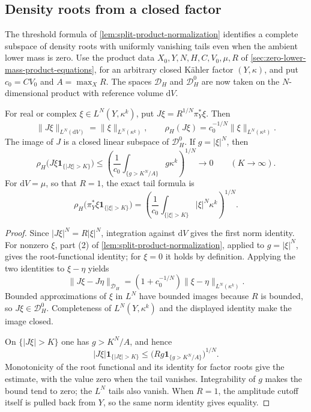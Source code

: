 \subsection{Density roots from a closed factor}
\label{subsec:closed-factor-roots}

The threshold formula of \cref{lem:split-product-normalization} identifies a complete subspace of density roots with uniformly vanishing tails even when the ambient lower mass is zero. Use the product data $X_0,Y,N,H,C,V_0,\mu,R$ of \cref{sec:zero-lower-mass-product-equations}, for an arbitrary closed K\"ahler factor $(Y,\kappa)$, and put $c_0=CV_0$ and $A=\max_XR$. The spaces $\mathcal D_H$ and $\mathcal D_H^0$ are now taken on the $N$-dimensional product with reference volume $\mathrm dV$.

\begin{proposition}\label{prop:closed-factor-density-roots}
For real or complex $\xi\in L^N(Y,\kappa^k)$, put $J\xi=R^{1/N}\pi_Y^*\xi$. Then
\[
 \|J\xi\|_{L^N(\mathrm dV)}=\|\xi\|_{L^N(\kappa^k)},\qquad
 \rho_H(J\xi)=c_0^{-1/N}\|\xi\|_{L^N(\kappa^k)}.
\]
The image of $J$ is a closed linear subspace of $\mathcal D_H^0$. If $g=|\xi|^N$, then
\[
 \rho_H\bigl(J\xi\mathbf1_{\{|J\xi|>K\}}\bigr)
 \leq\left(\frac1{c_0}\int_{\{g>K^N/A\}}g\kappa^k\right)^{1/N}
       \longrightarrow0
 \qquad(K\to\infty).
\]
For $\mathrm dV=\mu$, so that $R=1$, the exact tail formula is
\[
 \rho_H\bigl(\pi_Y^*\xi\mathbf1_{\{|\xi|>K\}}\bigr)
   =\left(\frac1{c_0}\int_{\{|\xi|>K\}}|\xi|^N\kappa^k\right)^{1/N}.
\]
\end{proposition}
\begin{proof}
Since $|J\xi|^N=R|\xi|^N$, integration against $\mathrm dV$ gives the first norm identity. For nonzero $\xi$, part (2) of \cref{lem:split-product-normalization}, applied to $g=|\xi|^N$, gives the root-functional identity; for $\xi=0$ it holds by definition. Applying the two identities to $\xi-\eta$ yields
\[
 \|J\xi-J\eta\|_{\mathcal D_H}
       =(1+c_0^{-1/N})\|\xi-\eta\|_{L^N(\kappa^k)}.
\]
Bounded approximations of $\xi$ in $L^N$ have bounded images because $R$ is bounded, so $J\xi\in\mathcal D_H^0$. Completeness of $L^N(Y,\kappa^k)$ and the displayed identity make the image closed.

On $\{|J\xi|>K\}$ one has $g>K^N/A$, and hence
\[
 |J\xi|\mathbf1_{\{|J\xi|>K\}}
    \leq\bigl(Rg\mathbf1_{\{g>K^N/A\}}\bigr)^{1/N}.
\]
Monotonicity of the root functional and its identity for factor roots give the estimate, with the value zero when the tail vanishes. Integrability of $g$ makes the bound tend to zero; the $L^N$ tails also vanish. When $R=1$, the amplitude cutoff itself is pulled back from $Y$, so the same norm identity gives equality.
\end{proof}

